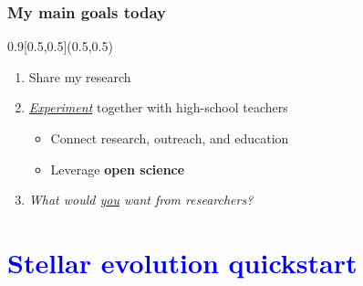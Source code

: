 \documentclass[xcolor=dvipsnames,professionalfonts, aspectratio=169]{beamer}
\begin{document}
\begin{frame}
  \frametitle{My main goals today}


  \begin{textblock}{0.9}[0.5,0.5](0.5,0.5)
    \centering
    \begin{enumerate}\Large
    \item Share my research\\[10pt]
    \item \emph{\underline{Experiment}} together with high-school teachers\\[10pt]
      \begin{itemize}\Large
      \item Connect research, outreach, and education
      \item Leverage \textbf{open science}
      \end{itemize}
    \item<2>[\textbf{Q.}] \emph{What would \underline{you} want from
        researchers?}
    \end{enumerate}

  \end{textblock}

\end{frame}


\section{\textcolor{Blue}{Stellar evolution quickstart}}
\end{document}
